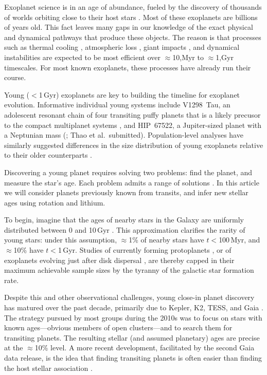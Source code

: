 \documentclass[11pt,twocolumn,tighten]{aastex63}
\begin{document}
Exoplanet science is in an age of abundance, fueled by the discovery
of thousands of worlds orbiting close to their host stars
\citep{Borucki10,2015JATIS...1a4003R}.  Most of these exoplanets are
billions of years old.  This fact leaves many gaps in our knowledge of
the exact physical and dynamical pathways that produce these objects.
The reason is that processes such as thermal cooling
\citep{2007ApJ...659.1661F}, atmospheric loss
\citep{2019AREPS..47...67O}, giant impacts
\citep{2014prpl.conf..595R}, and dynamical instabilities
\citep{2017MNRAS.470.1750I} are expected to be most efficient over
$\approx$10,Myr to $\approx$1,Gyr timescales. For most known
exoplanets, these processes have already run their course.

Young ($<$1\,Gyr) exoplanets are key to building the timeline for
exoplanet evolution.  Informative individual young systems include
V1298~Tau, an adolescent resonant chain of four transiting puffy
planets that is a likely precusor to the compact multiplanet systems
\citep{David_2019}, and HIP~67522, a Jupiter-sized planet with a
Neptunian mass (\citealt{Rizzuto_2020}; Thao et al.~submitted).
Population-level analyses have similarly suggested differences in the
size distribution of young exoplanets relative to their older
counterparts
\citep{Berger_2020b_rpage,David_2021,Sandoval_2021,2023AJ....166..248C,2024arXiv240303261V}.

Discovering a young planet requires solving two problems: find the
planet, and measure the star's age.  Each problem admits a range of
solutions \citep[e.g.][]{2008Sci...322.1348M,2012ApJ...756L..33Q}.  In
this article we will consider planets previously known from transits,
and infer new stellar ages using rotation and lithium.

To begin, imagine that the ages of nearby stars in the Galaxy are
uniformly distributed between 0 and 10\,Gyr \citep[e.g.~Fig~17
of][]{Nordstrom_2004}.  This approximation clarifies the rarity of
young stars: under this assumption, $\approx$1\% of nearby stars have
$t$$<$100\,Myr, and $\approx$10\% have $t$$<$1\,Gyr.  Studies of
currently forming protoplanets \citep{2018A&A...617A..44K}, or of
exoplanets evolving just after disk dispersal
\citep[e.g.][]{2022MNRAS.512.5067K}, are thereby capped in their
maximum achievable sample sizes by the tyranny of the galactic star
formation rate.

Despite this and other observational challenges, young close-in planet
discovery has matured over the past decade, primarily due to Kepler,
K2, TESS, and Gaia
\citep[e.g.][]{Meibom_2013,Mann_K2_25_2016,Curtis_2018,Livingston_2018,David_2019,Bouma_2020_toi837,Rizzuto_2020,Plavchan_2020,Newton_2021,Nardiello_2022,Barber_2022,Bouma_2022b,Zhou_2022,Zakhozhay_2022,Wood_2023}.
The strategy pursued by most groups during the 2010s was to focus on
stars with known ages---obvious members of open clusters---and to
search them for transiting planets.  The resulting stellar (and
assumed planetary) ages are precise at the $\approx$10\% level.  A
more recent development, facilitated by the second Gaia data release,
is the idea that finding transiting planets is often easier than
finding the host stellar association \citep[e.g.][]{Tofflemire_2021}.
\end{document}
